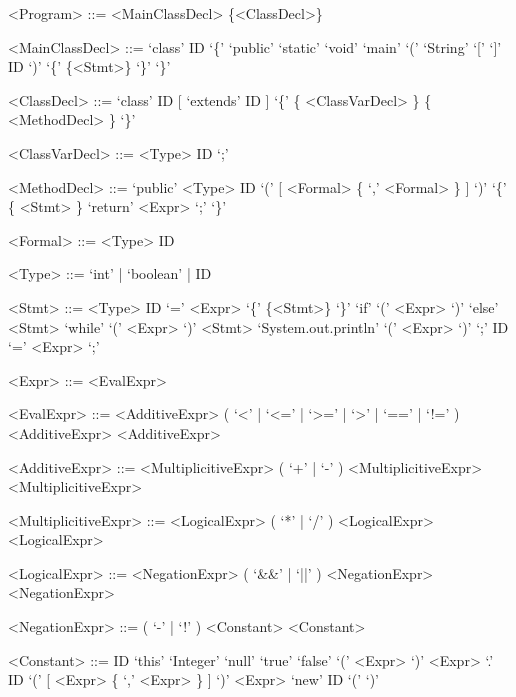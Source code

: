 \documentclass{report}
\begin{document}
\setlength{\grammarparsep}{12pt} %
\setlength{\grammarindent}{12em} %

\begin{grammar}

<Program> ::= <MainClassDecl> \{<ClassDecl>\}

<MainClassDecl> ::= `class' ID `\{' `public' `static' `void' `main' `(' `String' `[' `]' ID `)' `\{' \{<Stmt>\} `\}' `\}'

<ClassDecl> ::= `class' ID [ `extends' ID ] `\{' \{ <ClassVarDecl> \} \{ <MethodDecl> \} `\}'

<ClassVarDecl> ::= <Type> ID `;'

<MethodDecl> ::= `public' <Type> ID `(' [ <Formal> \{ `,' <Formal> \} ] `)' `\{' \{ <Stmt> \} `return' <Expr> `;' `\}'

<Formal> ::= <Type> ID

<Type> ::= `int' | `boolean' | ID

<Stmt> ::= <Type> ID `=' <Expr>
\alt `\{' \{<Stmt>\} `\}'
\alt `if' `(' <Expr> `)' `else' <Stmt>
\alt `while' `(' <Expr> `)' <Stmt>
\alt `System.out.println' `(' <Expr> `)' `;'
\alt ID `=' <Expr> `;'

<Expr> ::= <EvalExpr>

<EvalExpr> ::= <AdditiveExpr> ( `<' | `<=' | `>=' | `>' | `==' | `!=' ) <AdditiveExpr>
\alt <AdditiveExpr>

<AdditiveExpr> ::= <MultiplicitiveExpr> ( `+' | `-' ) <MultiplicitiveExpr> 
\alt <MultiplicitiveExpr>

<MultiplicitiveExpr> ::= <LogicalExpr> ( `*' | `/' ) <LogicalExpr>
\alt <LogicalExpr>

<LogicalExpr> ::= <NegationExpr> ( `&&' | `||' ) <NegationExpr> 
\alt <NegationExpr>

<NegationExpr> ::= ( `-' | `!' ) <Constant>
\alt <Constant>

<Constant> ::= ID
\alt `this'
\alt `Integer'
\alt `null'
\alt `true'
\alt `false'
\alt `(' <Expr> `)'
\alt <Expr> `.' ID `(' [ <Expr> \{ `,' <Expr> \} ] `)'
\alt <Expr> `new' ID `(' `)'

\end{grammar}
\end{document}
